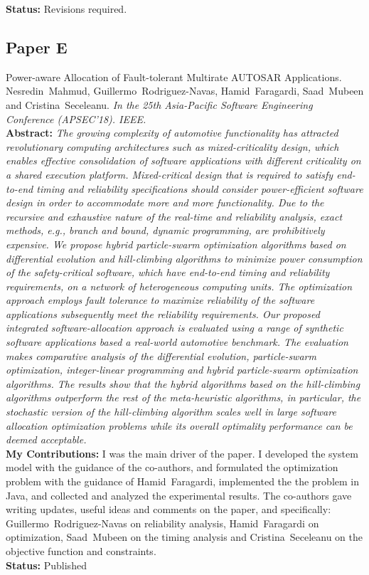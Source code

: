 	\noindent\textbf{Status:} Revisions required. 

\subsection*{Paper E}
Power-aware Allocation of Fault-tolerant Multirate AUTOSAR Applications.
     Nesredin~Mahmud, Guillermo~Rodriguez-Navas, Hamid~Faragardi, Saad~Mubeen and Cristina~Seceleanu. \textit{In the 25th Asia-Pacific Software Engineering Conference (APSEC'18). IEEE.}  
     \label{lbl_softwareallocation_ilp}
\\[6pt]%
\textbf{Abstract:} \textit{The growing complexity of automotive functionality has attracted revolutionary computing architectures such as mixed-criticality design, which enables effective consolidation of software applications with different criticality on a shared execution platform. Mixed-critical design that is required to satisfy end-to-end timing and reliability specifications should consider power-efficient software design in order to accommodate more and more functionality. Due to the recursive and exhaustive nature of the real-time and reliability analysis, exact methods, e.g., branch and bound, dynamic programming, are prohibitively expensive. We propose hybrid particle-swarm optimization algorithms based on differential evolution and hill-climbing algorithms to minimize power consumption of the safety-critical software, which have end-to-end timing and reliability requirements, on a network of heterogeneous computing units. The optimization approach employs fault tolerance to maximize reliability of the software applications subsequently meet the reliability requirements. Our proposed integrated software-allocation approach is evaluated using a range of synthetic software applications based a real-world automotive benchmark. The evaluation makes comparative analysis of the differential evolution, particle-swarm optimization, integer-linear programming and hybrid particle-swarm optimization algorithms. The results show that the hybrid algorithms based on the hill-climbing algorithms outperform the rest of the meta-heuristic algorithms, in particular, the stochastic version of the hill-climbing algorithm scales well in large software allocation optimization problems while its overall optimality performance can be deemed acceptable.
}\\[6pt]%
\textbf{My Contributions: } I was the main driver of the paper. I developed the system model with the guidance of the co-authors, and formulated the optimization problem with the guidance of Hamid~Faragardi, implemented the the problem in Java, and collected and analyzed the experimental results. The co-authors gave writing updates, useful ideas and comments on the paper, and specifically: Guillermo~Rodriguez-Navas on reliability analysis, Hamid~Faragardi on optimization, Saad~Mubeen on the timing analysis and Cristina~Seceleanu on the objective function and constraints.\\
\textbf{Status:} Published

